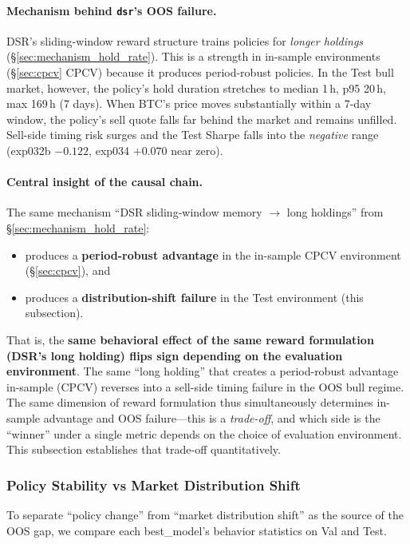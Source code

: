 \documentclass[11pt, a4paper]{article}
\begin{document}
\paragraph{Mechanism behind \texttt{dsr}'s OOS failure.}
DSR's sliding-window reward structure trains policies for \emph{longer
holdings} (\S\ref{sec:mechanism_hold_rate}). This is a strength in in-sample
environments (\S\ref{sec:cpcv} CPCV) because it produces period-robust
policies. In the Test bull market, however, the policy's hold duration
stretches to median 1\,h, p95 20\,h, max 169\,h (7 days). When BTC's price
moves substantially within a 7-day window, the policy's sell quote falls
far behind the market and remains unfilled. Sell-side timing risk surges and
the Test Sharpe falls into the \emph{negative} range (exp032b $-0.122$,
exp034 $+0.070$ near zero).

\paragraph{Central insight of the causal chain.}
The same mechanism ``DSR sliding-window memory $\to$ long holdings'' from
\S\ref{sec:mechanism_hold_rate}:
\begin{itemize}[leftmargin=*]
\item produces a \textbf{period-robust advantage} in the in-sample CPCV
environment (\S\ref{sec:cpcv}), and
\item produces a \textbf{distribution-shift failure} in the Test environment
(this subsection).
\end{itemize}
That is, the \textbf{same behavioral effect of the same reward formulation
(DSR's long holding) flips sign depending on the evaluation environment}.
The same ``long holding'' that creates a period-robust advantage in-sample
(CPCV) reverses into a sell-side timing failure in the OOS bull regime.
The same dimension of reward formulation thus simultaneously determines
in-sample advantage and OOS failure---this is a \emph{trade-off}, and which
side is the ``winner'' under a single metric depends on the choice of
evaluation environment. This subsection establishes that trade-off
quantitatively.

\subsubsection{Policy Stability vs Market Distribution Shift}
\label{sec:oos_policy_stability}

To separate ``policy change'' from ``market distribution shift'' as the
source of the OOS gap, we compare each best\_model's behavior statistics on
Val and Test.
\end{document}
